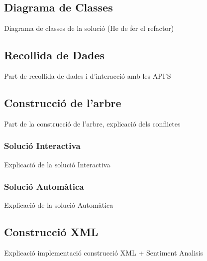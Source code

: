 
\subsection{Diagrama de Classes}
Diagrama de classes de la solució (He de fer el refactor)
\subsection{Recollida de Dades}
Part de recollida de dades i d'interacció amb les API'S
\subsection{Construcció de l'arbre}
Part de la construcció de l'arbre, explicació dels conflictes
\subsubsection{Solució Interactiva}
Explicació de la solució Interactiva
\subsubsection{Solució Automàtica}
Explicació de la solució Automàtica
\subsection{Construcció XML}
Explicació implementació construcció XML + Sentiment Analisis
